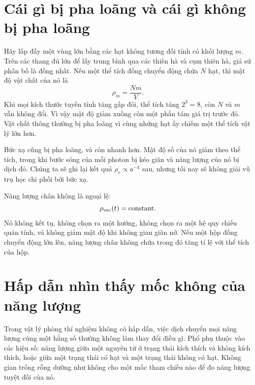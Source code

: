 \section{Cái gì bị pha loãng và cái gì không bị pha loãng}

Hãy lấp đầy một vùng lớn bằng các hạt không tương đối tính có khối lượng \(m\). Trên các thang đủ lớn để lấy trung bình qua các thiên hà và cụm thiên hà, giả sử phân bố là đồng nhất. Nếu một thể tích đồng chuyển động chứa \(N\) hạt, thì mật độ vật chất của nó là
\begin{equation}
\rho_m=\frac{Nm}{V}.
\end{equation}
Khi mọi kích thước tuyến tính tăng gấp đôi, thể tích tăng \(2^3=8\), còn \(N\) và \(m\) vẫn không đổi. Vì vậy mật độ giảm xuống còn một phần tám giá trị trước đó. Vật chất thông thường bị pha loãng vì cùng những hạt ấy chiếm một thể tích vật lý lớn hơn.

Bức xạ cũng bị pha loãng, và còn nhanh hơn. Mật độ số của nó giảm theo thể tích, trong khi bước sóng của mỗi photon bị kéo giãn và năng lượng của nó bị dịch đỏ. Chúng ta sẽ ghi lại kết quả \(\rho_r\propto a^{-4}\) sau, nhưng tối nay sẽ không giải vũ trụ học chi phối bởi bức xạ.

Năng lượng chân không là ngoại lệ:
\begin{equation}
\rho_{\rm vac}(t)=\text{constant}.
\label{eq:l08-rho-vac-constant}
\end{equation}
Nó không kết tụ, không chọn ra một hướng, không chọn ra một hệ quy chiếu quán tính, và không giảm mật độ khi không gian giãn nở. Nếu một hộp đồng chuyển động lớn lên, năng lượng chân không chứa trong đó tăng tỉ lệ với thể tích của hộp.


\section{Hấp dẫn nhìn thấy mốc không của năng lượng}

Trong vật lý phòng thí nghiệm không có hấp dẫn, việc dịch chuyển mọi năng lượng cùng một hằng số thường không làm thay đổi điều gì. Phổ phụ thuộc vào các hiệu số: năng lượng giữa một nguyên tử ở trạng thái kích thích và không kích thích, hoặc giữa một trạng thái có hạt và một trạng thái không có hạt. Không gian trống rỗng dường như không cho một mốc tham chiếu nào để đo năng lượng tuyệt đối của nó.

